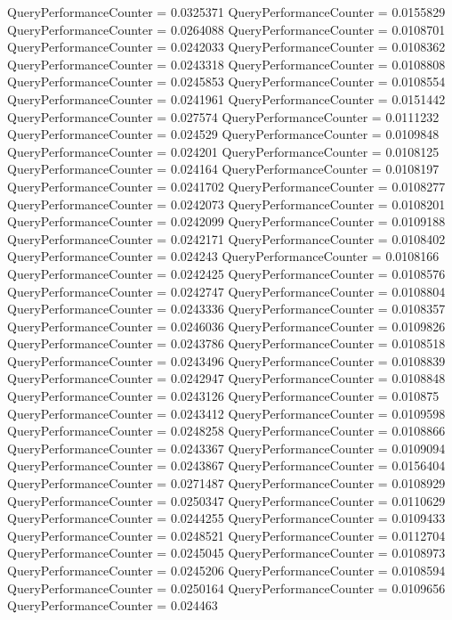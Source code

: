 \documentclass[9pt]{article}
\theoremstyle{plain}
\theoremstyle{definition}
\theoremstyle{remark}
\numberwithin{equation}{section}
\begin{document}
QueryPerformanceCounter  =  0.0325371
QueryPerformanceCounter  =  0.0155829
QueryPerformanceCounter  =  0.0264088
QueryPerformanceCounter  =  0.0108701
QueryPerformanceCounter  =  0.0242033
QueryPerformanceCounter  =  0.0108362
QueryPerformanceCounter  =  0.0243318
QueryPerformanceCounter  =  0.0108808
QueryPerformanceCounter  =  0.0245853
QueryPerformanceCounter  =  0.0108554
QueryPerformanceCounter  =  0.0241961
QueryPerformanceCounter  =  0.0151442
QueryPerformanceCounter  =  0.027574
QueryPerformanceCounter  =  0.0111232
QueryPerformanceCounter  =  0.024529
QueryPerformanceCounter  =  0.0109848
QueryPerformanceCounter  =  0.024201
QueryPerformanceCounter  =  0.0108125
QueryPerformanceCounter  =  0.024164
QueryPerformanceCounter  =  0.0108197
QueryPerformanceCounter  =  0.0241702
QueryPerformanceCounter  =  0.0108277
QueryPerformanceCounter  =  0.0242073
QueryPerformanceCounter  =  0.0108201
QueryPerformanceCounter  =  0.0242099
QueryPerformanceCounter  =  0.0109188
QueryPerformanceCounter  =  0.0242171
QueryPerformanceCounter  =  0.0108402
QueryPerformanceCounter  =  0.024243
QueryPerformanceCounter  =  0.0108166
QueryPerformanceCounter  =  0.0242425
QueryPerformanceCounter  =  0.0108576
QueryPerformanceCounter  =  0.0242747
QueryPerformanceCounter  =  0.0108804
QueryPerformanceCounter  =  0.0243336
QueryPerformanceCounter  =  0.0108357
QueryPerformanceCounter  =  0.0246036
QueryPerformanceCounter  =  0.0109826
QueryPerformanceCounter  =  0.0243786
QueryPerformanceCounter  =  0.0108518
QueryPerformanceCounter  =  0.0243496
QueryPerformanceCounter  =  0.0108839
QueryPerformanceCounter  =  0.0242947
QueryPerformanceCounter  =  0.0108848
QueryPerformanceCounter  =  0.0243126
QueryPerformanceCounter  =  0.010875
QueryPerformanceCounter  =  0.0243412
QueryPerformanceCounter  =  0.0109598
QueryPerformanceCounter  =  0.0248258
QueryPerformanceCounter  =  0.0108866
QueryPerformanceCounter  =  0.0243367
QueryPerformanceCounter  =  0.0109094
QueryPerformanceCounter  =  0.0243867
QueryPerformanceCounter  =  0.0156404
QueryPerformanceCounter  =  0.0271487
QueryPerformanceCounter  =  0.0108929
QueryPerformanceCounter  =  0.0250347
QueryPerformanceCounter  =  0.0110629
QueryPerformanceCounter  =  0.0244255
QueryPerformanceCounter  =  0.0109433
QueryPerformanceCounter  =  0.0248521
QueryPerformanceCounter  =  0.0112704
QueryPerformanceCounter  =  0.0245045
QueryPerformanceCounter  =  0.0108973
QueryPerformanceCounter  =  0.0245206
QueryPerformanceCounter  =  0.0108594
QueryPerformanceCounter  =  0.0250164
QueryPerformanceCounter  =  0.0109656
QueryPerformanceCounter  =  0.024463
\end{document}
